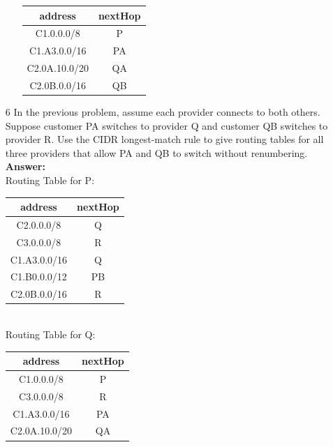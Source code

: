 \documentclass[a4paper]{article}
\begin{document}
\begin{itemize}
\begin{itemize}
	      	      \begin{tabular}{|c|c|}
	      	      	\hline
	      	      	address       & nextHop \\
	      	      	\hline
	      	      	C1.0.0.0/8    & P       \\
	      	      	\hline	
	      	      	C1.A3.0.0/16  & PA      \\
	      	      	\hline	
	      	      	C2.0A.10.0/20 & QA      \\
	      	      	\hline	
	      	      	C2.0B.0.0/16  & QB      \\
	      	      	\hline
	      	      \end{tabular}
	      \end{itemize}
	\item[6] In the previous problem, assume each provider connects to both others. Suppose customer PA switches to provider Q and customer QB switches to provider R. Use the CIDR longest-match rule to give routing tables for all three providers that allow PA and QB to switch without renumbering. \\
	      \textbf{Answer:} \\
	      Routing Table for P: \\
	      \begin{tabular}{|c|c|}
	      	\hline
	      	address      & nextHop \\
	      	\hline
	      	C2.0.0.0/8   & Q       \\
	      	\hline	
	      	C3.0.0.0/8   & R       \\
	      	\hline	
	      	C1.A3.0.0/16 & Q       \\
	      	\hline	
	      	C1.B0.0.0/12 & PB      \\
	      	\hline
	      	C2.0B.0.0/16 & R       \\
	      	\hline
	      \end{tabular} \\
	      Routing Table for Q: \\
	      \begin{tabular}{|c|c|}
	      	\hline
	      	address       & nextHop \\
	      	\hline
	      	C1.0.0.0/8    & P       \\
	      	\hline	
	      	C3.0.0.0/8    & R       \\
	      	\hline	
	      	C1.A3.0.0/16  & PA      \\
	      	\hline
	      	C2.0A.10.0/20 & QA      \\
	      	\hline	

\end{tabular}
\end{itemize}
\end{document}
